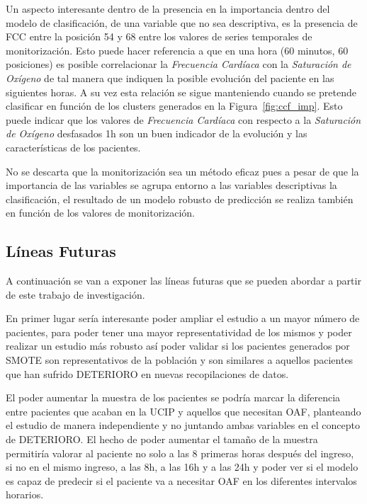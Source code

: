 {Un aspecto interesante dentro de la presencia en la importancia dentro del modelo de clasificación, de una variable que no sea descriptiva, es la presencia de FCC entre la posición 54 y 68 entre los valores de series temporales de monitorización. Esto puede hacer referencia a que en una hora (60 minutos, 60 posiciones) es posible correlacionar la \textit{Frecuencia Cardíaca} con la \textit{Saturación de Oxígeno} de tal manera que indiquen la posible evolución del paciente en las siguientes horas. A su vez esta relación se sigue manteniendo cuando se pretende clasificar en función de los clusters generados en la Figura~\ref{fig:ccf_imp}. Esto puede indicar que los valores de \textit{Frecuencia Cardíaca} con respecto a la \textit{Saturación de Oxígeno} desfasados 1h son un buen indicador de la evolución y las características de los pacientes.

No se descarta que la monitorización sea un método eficaz pues a pesar de que la importancia de las variables se agrupa entorno a las variables descriptivas la clasificación, el resultado de un modelo robusto de predicción se realiza también en función de los valores de monitorización.

\subsection{Líneas Futuras}\label{sec:lineas-futuras}

A continuación se van a exponer las líneas futuras que se pueden abordar a partir de este trabajo de investigación.

En primer lugar sería interesante poder ampliar el estudio a un mayor número de pacientes, para poder tener una mayor representatividad de los mismos y poder realizar un estudio más robusto así poder validar si los pacientes generados por SMOTE son representativos de la población y son similares a aquellos pacientes que han sufrido DETERIORO en nuevas recopilaciones de datos.

El poder aumentar la muestra de los pacientes se podría marcar la diferencia entre pacientes que acaban en la UCIP y aquellos que necesitan OAF, planteando el estudio de manera independiente y no juntando ambas variables en el concepto de DETERIORO. El hecho de poder aumentar el tamaño de la muestra permitiría valorar al paciente no solo a las 8 primeras horas después del ingreso, si no en el mismo ingreso, a las 8h, a las 16h y a las 24h y poder ver si el modelo es capaz de predecir si el paciente va a necesitar OAF en los diferentes intervalos horarios.

}
